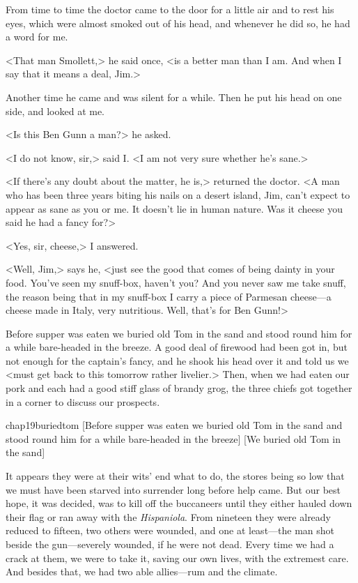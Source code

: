 From time to time the doctor came to the door for a little air and to rest his eyes, which were almost smoked out of his head, and whenever he did so, he had a word for me.

<That man Smollett,> he said once, <is a better man than I am. And when I say that it means a deal, Jim.>

Another time he came and was silent for a while. Then he put his head on one side, and looked at me.

<Is this Ben Gunn a man?> he asked.

<I do not know, sir,> said I\@. <I am not very sure whether he's sane.>

<If there's any doubt about the matter, he is,> returned the doctor. <A man who has been three years biting his nails on a desert island, Jim, can't expect to appear as sane as you or me. It doesn't lie in human nature. Was it cheese you said he had a fancy for?>

<Yes, sir, cheese,> I answered.

<Well, Jim,> says he, <just see the good that comes of being dainty in your food. You've seen my snuff-box, haven't you? And you never saw me take snuff, the reason being that in my snuff-box I carry a piece of Parmesan cheese—a cheese made in Italy, very nutritious. Well, that's for Ben Gunn!>

Before supper was eaten we buried old Tom in the sand and stood round him for a while bare-headed in the breeze. A good deal of firewood had been got in, but not enough for the captain's fancy, and he shook his head over it and told us we <must get back to this tomorrow rather livelier.> Then, when we had eaten our pork and each had a good stiff glass of brandy grog, the three chiefs got together in a corner to discuss our prospects.

\begin{bwbigpic}
	[\basicscale]
	{chap19buriedtom}
	[Before supper was eaten we buried old Tom in the sand and stood round him for a while bare-headed in the breeze]
	[We buried old Tom in the sand]
\end{bwbigpic}

It appears they were at their wits' end what to do, the stores being so low that we must have been starved into surrender long before help came. But our best hope, it was decided, was to kill off the buccaneers until they either hauled down their flag or ran away with the \textit{Hispaniola}. From nineteen they were already reduced to fifteen, two others were wounded, and one at least—the man shot beside the gun—severely wounded, if he were not dead. Every time we had a crack at them, we were to take it, saving our own lives, with the extremest care. And besides that, we had two able allies—rum and the climate.

